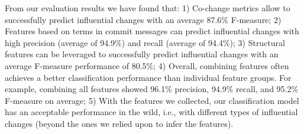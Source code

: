 

From our evaluation results we have found that: 1) Co-change metrics allow
to successfully predict influential changes with an average 87.6\% F-measure;
2) Features based on terms in commit messages can predict influential changes
with high precision (average of 94.9\%) and recall (average of 94.4\%); 3)
Structural features can be leveraged to successfully predict influential
changes with an average F-measure performance of 80.5\%; 4) Overall, combining
features often achieves a better classification performance than individual
feature groups. For example, combining all features showed 96.1\% precision,
94.9\% recall, and 95.2\% F-measure on average; 5) With the features we
collected, our classification model has an acceptable performance in the wild, i.e.,
with different types of influential changes (beyond the ones we relied upon to infer
the features).
